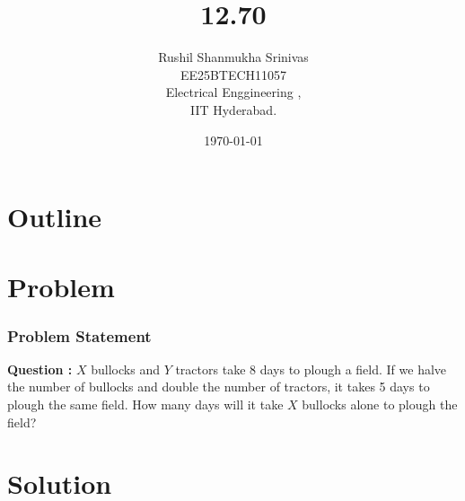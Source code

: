 \documentclass{beamer}
\title{12.70}
\author{Rushil Shanmukha Srinivas \\EE25BTECH11057 \\ Electrical Enggineering ,\\IIT Hyderabad.}
\date{\today}
\theoremstyle{remark}
\numberwithin{equation}{section}
\numberwithin{equation}{section}
\begin{document}
 

\begin{frame}
\titlepage
\end{frame}

\section*{Outline}
\begin{frame}
\tableofcontents
\end{frame}
\section{Problem}
\begin{frame}
\frametitle{Problem Statement}
\textbf{Question :} 
$X$ bullocks and $Y$ tractors take 8 days to plough a field. If we halve the number of bullocks and double the number of tractors, it takes 5 days to plough the same field.
How many days will it take $X$ bullocks alone to plough the field?

\end{frame}
\section{Solution}
\end{document}
